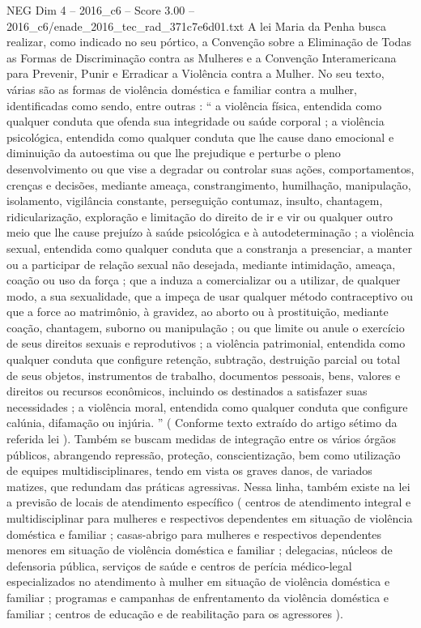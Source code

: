 \begin{textsample}{NEG Dim 4 – 2016\_c6 – Score 3.00 – 2016\_c6/enade\_2016\_tec\_rad\_371c7e6d01.txt}
A lei Maria da Penha busca realizar, como indicado no seu pórtico, a Convenção sobre a Eliminação de Todas as Formas de Discriminação contra as Mulheres e a Convenção Interamericana para Prevenir, Punir e Erradicar a Violência contra a Mulher.
No seu texto, várias são as formas de violência doméstica e familiar contra a mulher, identificadas como sendo, entre outras : “ a violência física, entendida como qualquer conduta que ofenda sua integridade ou saúde corporal ; a violência psicológica, entendida como qualquer conduta que lhe cause dano emocional e diminuição da autoestima ou que lhe prejudique e perturbe o pleno desenvolvimento ou que vise a degradar ou controlar suas ações, comportamentos, crenças e decisões, mediante ameaça, constrangimento, humilhação, manipulação, isolamento, vigilância constante, perseguição contumaz, insulto, chantagem, ridicularização, exploração e limitação do direito de ir e vir ou qualquer outro meio que lhe cause prejuízo à saúde psicológica e à autodeterminação ; a violência sexual, entendida como qualquer conduta que a constranja a presenciar, a manter ou a participar de relação sexual não desejada, mediante intimidação, ameaça, coação ou uso da força ; que a induza a comercializar ou a utilizar, de qualquer modo, a sua sexualidade, que a impeça de usar qualquer método contraceptivo ou que a force ao matrimônio, à gravidez, ao aborto ou à prostituição, mediante coação, chantagem, suborno ou manipulação ; ou que limite ou anule o exercício de seus direitos sexuais e reprodutivos ; a violência patrimonial, entendida como qualquer conduta que configure retenção, subtração, destruição parcial ou total de seus objetos, instrumentos de trabalho, documentos pessoais, bens, valores e direitos ou recursos econômicos, incluindo os destinados a satisfazer suas necessidades ; a violência moral, entendida como qualquer conduta que configure calúnia, difamação ou injúria. ” ( Conforme texto extraído do artigo sétimo da referida lei ).
Também se buscam medidas de integração entre os vários órgãos públicos, abrangendo repressão, proteção, conscientização, bem como utilização de equipes multidisciplinares, tendo em vista os graves danos, de variados matizes, que redundam das práticas agressivas.
Nessa linha, também existe na lei a previsão de locais de atendimento específico ( centros de atendimento integral e multidisciplinar para mulheres e respectivos dependentes em situação de violência doméstica e familiar ; casas-abrigo para mulheres e respectivos dependentes menores em situação de violência doméstica e familiar ; delegacias, núcleos de defensoria pública, serviços de saúde e centros de perícia médico-legal especializados no atendimento à mulher em situação de violência doméstica e familiar ; programas e campanhas de enfrentamento da violência doméstica e familiar ; centros de educação e de reabilitação para os agressores ).

\end{textsample}
